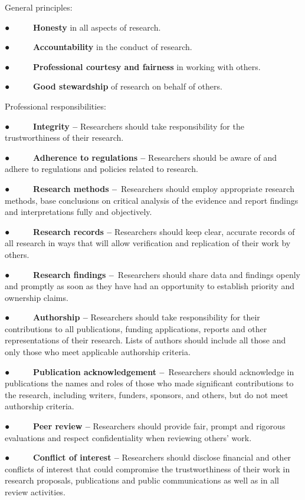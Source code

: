 \documentclass[
]{book}
\begin{document}
General principles:

● ~ ~ ~ \textbf{Honesty} in all aspects of research.

● ~ ~ ~ \textbf{Accountability} in the conduct of research.

● ~ ~ ~ \textbf{Professional courtesy and fairness} in working with others.

● ~ ~ ~ \textbf{Good stewardship} of research on behalf of others.

Professional responsibilities:

● ~ ~ ~ \textbf{Integrity --} Researchers should take responsibility for the trustworthiness of their research.

● ~ ~ ~ \textbf{Adherence to regulations --} Researchers should be aware of and adhere to regulations and policies related to research.

● ~ ~ ~ \textbf{Research methods --}~Researchers should employ appropriate research methods, base conclusions on critical analysis of the evidence and report findings and interpretations fully and objectively.

● ~ ~ ~ \textbf{Research records --} Researchers should keep clear, accurate records of all research in ways that will allow verification and replication of their work by others.

● ~ ~ ~ \textbf{Research findings --}~Researchers should share data and findings openly and promptly as soon as they have had an opportunity to establish priority and ownership claims.

● ~ ~ ~ \textbf{Authorship --} Researchers should take responsibility for their contributions to all publications, funding applications, reports and other representations of their research. Lists of authors should include all those and only those who meet applicable authorship criteria.

● ~ ~ ~ \textbf{Publication acknowledgement --}~Researchers should acknowledge in publications the names and roles of those who made significant contributions to the research, including writers, funders, sponsors, and others, but do not meet authorship criteria.

● ~ ~ ~ \textbf{Peer review --} Researchers should provide fair, prompt and rigorous evaluations and respect confidentiality when reviewing others' work.

● ~ ~ ~ \textbf{Conflict of interest --} Researchers should disclose financial and other conflicts of interest that could compromise the trustworthiness of their work in research proposals, publications and public communications as well as in all review activities.
\end{document}
